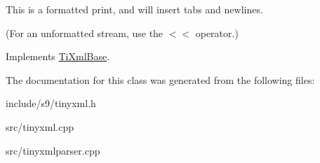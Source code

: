 This is a formatted print, and will insert tabs and newlines.

(For an unformatted stream, use the $<$$<$ operator.) 

Implements \hyperlink{classTiXmlBase_a0de56b3f2ef14c65091a3b916437b512}{Ti\-Xml\-Base}.



The documentation for this class was generated from the following files\-:\begin{DoxyCompactItemize}
\item 
include/s9/tinyxml.\-h\item 
src/tinyxml.\-cpp\item 
src/tinyxmlparser.\-cpp\end{DoxyCompactItemize}
